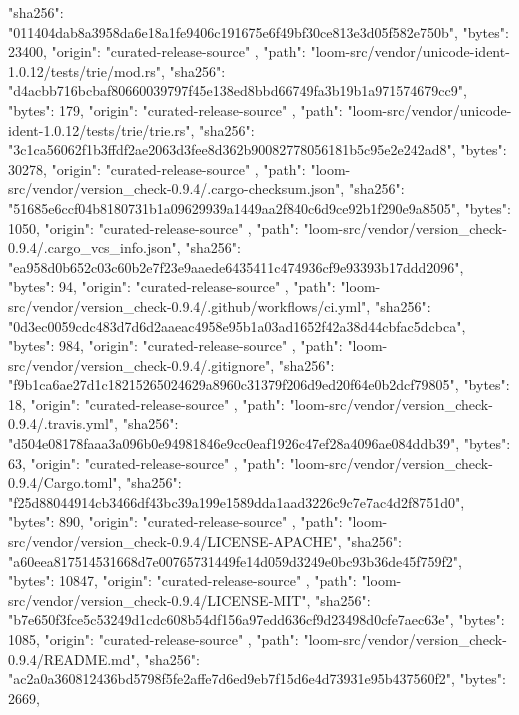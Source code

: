 {{      "sha256": "011404dab8a3958da6e18a1fe9406c191675e6f49bf30ce813e3d05f582e750b",
      "bytes": 23400,
      "origin": "curated-release-source"
    },
    {
      "path": "loom-src/vendor/unicode-ident-1.0.12/tests/trie/mod.rs",
      "sha256": "d4acbb716bcbaf80660039797f45e138ed8bbd66749fa3b19b1a971574679cc9",
      "bytes": 179,
      "origin": "curated-release-source"
    },
    {
      "path": "loom-src/vendor/unicode-ident-1.0.12/tests/trie/trie.rs",
      "sha256": "3c1ca56062f1b3ffdf2ae2063d3fee8d362b90082778056181b5c95e2e242ad8",
      "bytes": 30278,
      "origin": "curated-release-source"
    },
    {
      "path": "loom-src/vendor/version_check-0.9.4/.cargo-checksum.json",
      "sha256": "51685e6ccf04b8180731b1a09629939a1449aa2f840c6d9ce92b1f290e9a8505",
      "bytes": 1050,
      "origin": "curated-release-source"
    },
    {
      "path": "loom-src/vendor/version_check-0.9.4/.cargo_vcs_info.json",
      "sha256": "ea958d0b652c03c60b2e7f23e9aaede6435411c474936cf9e93393b17ddd2096",
      "bytes": 94,
      "origin": "curated-release-source"
    },
    {
      "path": "loom-src/vendor/version_check-0.9.4/.github/workflows/ci.yml",
      "sha256": "0d3ec0059cdc483d7d6d2aaeac4958e95b1a03ad1652f42a38d44cbfac5dcbca",
      "bytes": 984,
      "origin": "curated-release-source"
    },
    {
      "path": "loom-src/vendor/version_check-0.9.4/.gitignore",
      "sha256": "f9b1ca6ae27d1c18215265024629a8960c31379f206d9ed20f64e0b2dcf79805",
      "bytes": 18,
      "origin": "curated-release-source"
    },
    {
      "path": "loom-src/vendor/version_check-0.9.4/.travis.yml",
      "sha256": "d504e08178faaa3a096b0e94981846e9cc0eaf1926c47ef28a4096ae084ddb39",
      "bytes": 63,
      "origin": "curated-release-source"
    },
    {
      "path": "loom-src/vendor/version_check-0.9.4/Cargo.toml",
      "sha256": "f25d88044914cb3466df43bc39a199e1589dda1aad3226c9c7e7ac4d2f8751d0",
      "bytes": 890,
      "origin": "curated-release-source"
    },
    {
      "path": "loom-src/vendor/version_check-0.9.4/LICENSE-APACHE",
      "sha256": "a60eea817514531668d7e00765731449fe14d059d3249e0bc93b36de45f759f2",
      "bytes": 10847,
      "origin": "curated-release-source"
    },
    {
      "path": "loom-src/vendor/version_check-0.9.4/LICENSE-MIT",
      "sha256": "b7e650f3fce5c53249d1cdc608b54df156a97edd636cf9d23498d0cfe7aec63e",
      "bytes": 1085,
      "origin": "curated-release-source"
    },
    {
      "path": "loom-src/vendor/version_check-0.9.4/README.md",
      "sha256": "ac2a0a360812436bd5798f5fe2affe7d6ed9eb7f15d6e4d73931e95b437560f2",
      "bytes": 2669,
}}
